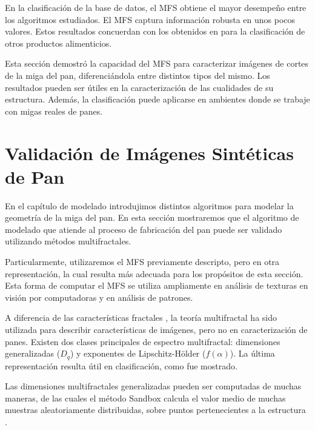 En la clasificación de la base de datos, el MFS obtiene el mayor desempeño entre los algoritmos estudiados.
El MFS captura información robusta en unos pocos valores.
Estos resultados concuerdan con los obtenidos en \cite{Bosch2011} para la clasificación de otros productos alimenticios.

Esta sección demostró la capacidad del MFS para caracterizar imágenes de cortes de la miga del pan, diferenciándola entre distintos tipos del mismo.
Los resultados pueden ser útiles en la caracterización de las cualidades de su estructura.
Además, la clasificación puede aplicarse en ambientes donde se trabaje con migas reales de panes.



\section{Validación de Imágenes Sintéticas de Pan}

En el capítulo de modelado introdujimos distintos algoritmos para modelar la geometría de la miga del pan.
En esta sección mostraremos que el algoritmo de modelado que atiende al proceso de fabricación del pan puede ser validado utilizando métodos multifractales.

Particularmente, utilizaremos el MFS previamente descripto, pero en otra representación, la cual resulta más adecuada para los propósitos de esta sección.
Esta forma de computar el MFS se utiliza ampliamente en análisis de texturas en visión por computadoras y en análisis de patrones.

A diferencia de las características fractales \cite{Gonzales2008}, la teoría multifractal ha sido utilizada para describir características de imágenes, pero no en caracterización de panes.
Existen dos clases principales de espectro multifractal: dimensiones generalizadas ($D_{q}$) y exponentes de Lipschitz-H\"older ($f(\alpha)$). 
La última representación resulta útil en clasificación, como fue mostrado.

Las dimensiones multifractales generalizadas pueden ser computadas de muchas maneras, de las cuales el método Sandbox \cite{Tel1989} calcula el valor medio de muchas muestras aleatoriamente distribuidas, sobre puntos pertenecientes a la estructura \cite{Debartolo2004}. 


